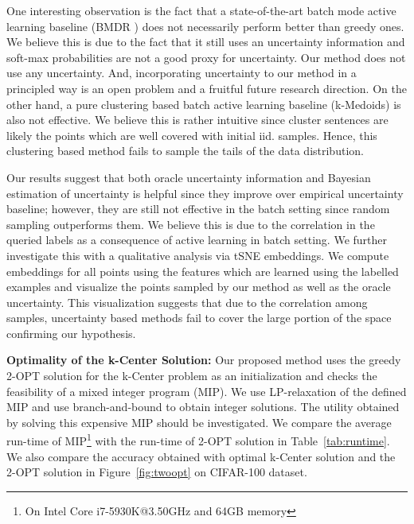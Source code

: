 \documentclass{article} \usepackage{iclr2018_conference,times}
\begin{document}
One interesting observation is the fact that a state-of-the-art batch mode active learning baseline (BMDR \citep{kdd13}) does not necessarily perform better than greedy ones. We believe this is due to the fact that it still uses an uncertainty information and soft-max probabilities are not a good proxy for uncertainty. Our method does not use any uncertainty. And, incorporating uncertainty to our method in a principled way is an open problem and a fruitful future research direction. On the other hand, a pure clustering based batch active learning baseline (k-Medoids) is also not effective. We believe this is rather intuitive since cluster sentences are likely the points which are well covered with initial iid. samples. Hence, this clustering based method fails to sample the tails of the data distribution.

Our results suggest that both oracle uncertainty information and Bayesian estimation of uncertainty is helpful since they improve over empirical uncertainty baseline; however, they are still not effective in the batch setting since random sampling outperforms them. We believe this is due to the correlation in the queried labels as a consequence of active learning in batch setting. We further investigate this with a qualitative analysis via
tSNE \citep{tsne} embeddings. We compute embeddings for all points using the features which are learned using the
labelled examples and visualize the points sampled by our method as well as the oracle uncertainty. This visualization
suggests that due to the correlation among samples, uncertainty based methods fail to cover the large portion of the
space confirming our hypothesis.



\noindent\textbf{Optimality of the k-Center Solution:} Our proposed method uses the greedy 2-OPT solution for the
k-Center problem as an initialization and checks the feasibility of a mixed integer program (MIP). We use
LP-relaxation of the defined MIP and use branch-and-bound to obtain integer solutions. The utility obtained by solving
this expensive MIP should be investigated. We compare the average run-time of MIP\footnote{On Intel Core
i7-5930K@3.50GHz and 64GB memory} with the run-time of 2-OPT solution in Table~\ref{tab:runtime}. We also compare the
accuracy obtained with optimal k-Center solution and the 2-OPT solution in Figure~\ref{fig:twoopt} on CIFAR-100 dataset.
\end{document}
